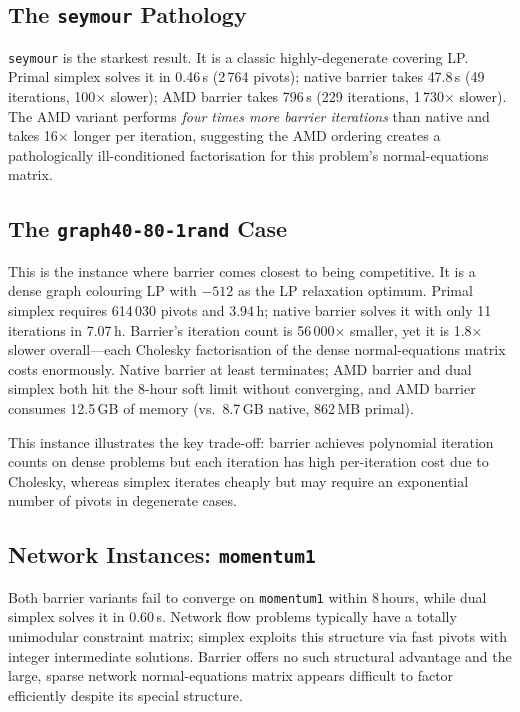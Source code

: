 \documentclass[11pt,a4paper]{article}
\begin{document}
\subsection{The \texttt{seymour} Pathology}

\texttt{seymour} is the starkest result.  It is a classic highly-degenerate
covering LP.  Primal simplex solves it in 0.46\,s (2\,764 pivots); native
barrier takes 47.8\,s (49 iterations, 100$\times$ slower); AMD barrier takes
796\,s (229 iterations, 1\,730$\times$ slower).  The AMD variant performs
\emph{four times more barrier iterations} than native and takes 16$\times$
longer per iteration, suggesting the AMD ordering creates a pathologically
ill-conditioned factorisation for this problem's normal-equations matrix.

\subsection{The \texttt{graph40-80-1rand} Case}

This is the instance where barrier comes closest to being competitive.  It
is a dense graph colouring LP with $-512$ as the LP relaxation optimum.
Primal simplex requires 614\,030 pivots and 3.94\,h; native barrier solves
it with only 11 iterations in 7.07\,h.  Barrier's iteration count is
56\,000$\times$ smaller, yet it is 1.8$\times$ slower overall---each
Cholesky factorisation of the dense normal-equations matrix costs enormously.
Native barrier at least terminates; AMD barrier and dual simplex both hit the
8-hour soft limit without converging, and AMD barrier consumes 12.5\,GB of
memory (vs.\ 8.7\,GB native, 862\,MB primal).

This instance illustrates the key trade-off: barrier achieves polynomial
iteration counts on dense problems but each iteration has high
per-iteration cost due to Cholesky, whereas simplex iterates cheaply but may
require an exponential number of pivots in degenerate cases.

\subsection{Network Instances: \texttt{momentum1}}

Both barrier variants fail to converge on \texttt{momentum1} within 8\,hours,
while dual simplex solves it in 0.60\,s.  Network flow problems typically
have a totally unimodular constraint matrix; simplex exploits this structure
via fast pivots with integer intermediate solutions.  Barrier offers no such
structural advantage and the large, sparse network normal-equations matrix
appears difficult to factor efficiently despite its special structure.
\end{document}
